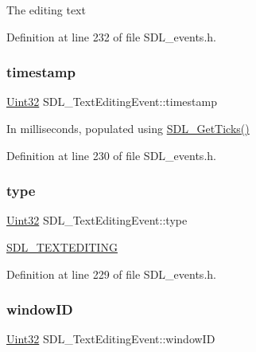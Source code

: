 The editing text 

Definition at line 232 of file S\+D\+L\+\_\+events.\+h.

\mbox{\label{struct_s_d_l___text_editing_event_afc164f40abee6fd8e72e01b589210c75}} 
\subsubsection{\texorpdfstring{timestamp}{timestamp}}
{\footnotesize\ttfamily \mbox{\hyperlink{_s_d_l__stdinc_8h_add440eff171ea5f55cb00c4a9ab8672d}{Uint32}} S\+D\+L\+\_\+\+Text\+Editing\+Event\+::timestamp}

In milliseconds, populated using \mbox{\hyperlink{_s_d_l__timer_8h_a0b9bc71d6287e0ffafdc3419760fe2b3}{S\+D\+L\+\_\+\+Get\+Ticks()}} 

Definition at line 230 of file S\+D\+L\+\_\+events.\+h.

\mbox{\label{struct_s_d_l___text_editing_event_a198e6df194a3bf12cf5f82553e84c7cb}} 
\subsubsection{\texorpdfstring{type}{type}}
{\footnotesize\ttfamily \mbox{\hyperlink{_s_d_l__stdinc_8h_add440eff171ea5f55cb00c4a9ab8672d}{Uint32}} S\+D\+L\+\_\+\+Text\+Editing\+Event\+::type}

\mbox{\hyperlink{_s_d_l__events_8h_a3b589e89be6b35c02e0dd34a55f3fccaa1b80c465df69c0b6d06f026ce7a230e3}{S\+D\+L\+\_\+\+T\+E\+X\+T\+E\+D\+I\+T\+I\+NG}} 

Definition at line 229 of file S\+D\+L\+\_\+events.\+h.

\mbox{\label{struct_s_d_l___text_editing_event_a23b3e414cf7a7ccc547b7595ca930049}} 
\subsubsection{\texorpdfstring{windowID}{windowID}}
{\footnotesize\ttfamily \mbox{\hyperlink{_s_d_l__stdinc_8h_add440eff171ea5f55cb00c4a9ab8672d}{Uint32}} S\+D\+L\+\_\+\+Text\+Editing\+Event\+::window\+ID}

